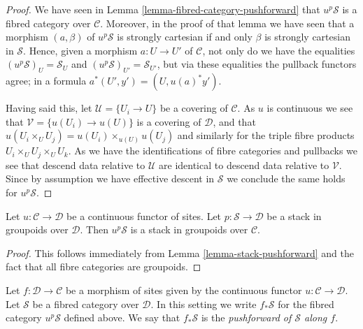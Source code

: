 \begin{proof}
We have seen in
Lemma \ref{lemma-fibred-category-pushforward}
that $u^p\mathcal{S}$ is a fibred category over $\mathcal{C}$.
Moreover, in the proof of that lemma we have seen that a morphism
$(a, \beta)$ of $u^p\mathcal{S}$ is strongly cartesian if and
only $\beta$ is strongly cartesian in $\mathcal{S}$. Hence,
given a morphism $a : U \to U'$ of $\mathcal{C}$, not only
do we have the equalities
$(u^p\mathcal{S})_U = \mathcal{S}_U$ and
$(u^p\mathcal{S})_{U'} = \mathcal{S}_{U'}$, but via these
equalities the pullback functors agree; in a formula
$a^*(U', y') = (U, u(a)^*y')$.

\medskip\noindent
Having said this, let $\mathcal{U} = \{U_i \to U\}$ be a covering
of $\mathcal{C}$. As $u$ is continuous we see that
$\mathcal{V} = \{u(U_i) \to u(U)\}$ is a covering of $\mathcal{D}$,
and that $u(U_i \times_U U_j) = u(U_i) \times_{u(U)} u(U_j)$ and
similarly for the triple fibre products $U_i \times_U U_j \times_U U_k$.
As we have the identifications of fibre categories and pullbacks
we see that descend data relative to $\mathcal{U}$ are identical
to descend data relative to $\mathcal{V}$. Since by assumption we have
effective descent in $\mathcal{S}$ we conclude the same holds for
$u^p\mathcal{S}$.
\end{proof}

\begin{lemma}
\label{lemma-stack-in-groupoids-pushforward}
Let $u : \mathcal{C} \to \mathcal{D}$ be a continuous functor of sites.
Let $p : \mathcal{S} \to \mathcal{D}$ be a stack in groupoids
over $\mathcal{D}$. Then $u^p\mathcal{S}$ is a stack in groupoids
over $\mathcal{C}$.
\end{lemma}

\begin{proof}
This follows immediately from
Lemma \ref{lemma-stack-pushforward}
and the fact that all fibre categories are groupoids.
\end{proof}

\begin{definition}
\label{definition-pushforward-stack}
Let $f : \mathcal{D} \to \mathcal{C}$ be a morphism of sites
given by the continuous functor $u : \mathcal{C} \to \mathcal{D}$.
Let $\mathcal{S}$ be a fibred category over $\mathcal{D}$.
In this setting we write {\it $f_*\mathcal{S}$} for the fibred
category $u^p\mathcal{S}$ defined above. We say that
$f_*\mathcal{S}$ is the {\it pushforward of $\mathcal{S}$ along $f$}.
\end{definition}

